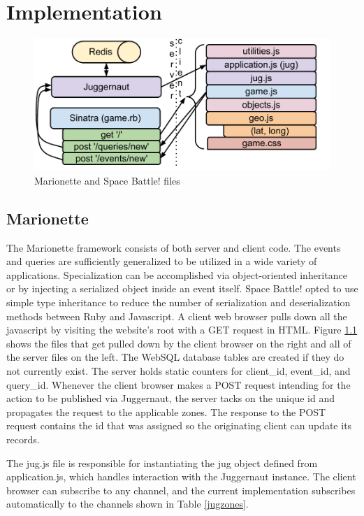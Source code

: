 \documentclass[12pt]{report}	%
\theoremstyle{definition}
\theoremstyle{remark}
\begin{document}
\chapter{Implementation}

\begin{figure}[h!]
\centering
\includegraphics[scale=0.9]{3.pdf}
\caption{Marionette and Space Battle! files}
\label{files}
\end{figure}

\section{Marionette}

The Marionette framework consists of both server and client code. The
events and queries are sufficiently generalized to be utilized in a wide
variety of applications. Specialization can be accomplished via object-oriented 
inheritance or by injecting a serialized object inside an
event itself. Space Battle! opted to use simple type inheritance to
reduce the number of serialization and deserialization methods between
Ruby and Javascript. A client web browser pulls down all the javascript
by visiting the website's root with a GET request in HTML. Figure
\ref{files} shows the files that get pulled down by the
client browser on the right and all of the server files on the left. The
WebSQL database tables are created if they do not currently exist. The
server holds static counters for client\_id, event\_id, and query\_id.
Whenever the client browser makes a POST request intending for the
action to be published via Juggernaut, the server tacks on the unique id
and propagates the request to the applicable zones. The response to the
POST request contains the id that was assigned so the originating client
can update its records.

The jug.js file is responsible for instantiating the jug object defined
from application.js, which handles interaction with the Juggernaut
instance. The client browser can subscribe to any channel, and the
current implementation subscribes automatically to the channels shown in
Table \ref{jugzones}.
\end{document}
